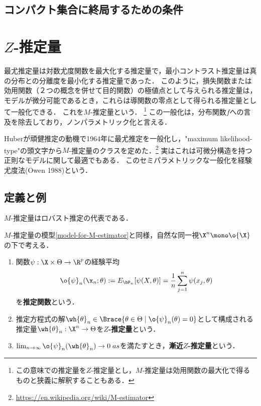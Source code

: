 \documentclass[uplatex,dvipdfmx]{jsreport}
\begin{document}
\subsection{コンパクト集合に終局するための条件}

\section{$Z$-推定量}

\begin{tcolorbox}[colframe=ForestGreen, colback=ForestGreen!10!white,breakable,colbacktitle=ForestGreen!40!white,coltitle=black,fonttitle=\bfseries\sffamily,
title=最尤法のノンパラメトリック化]
    最尤推定量は対数尤度関数を最大化する推定量で，最小コントラスト推定量は真の分布との分離度を最小化する推定量であった．
    このように，損失関数または効用関数（２つの概念を併せて目的関数）の極値点として与えられる推定量は，
    モデルが微分可能であるとき，これらは導関数の零点として得られる推定量として一般化できる．
    これを$M$-推定量という．
    \footnote{この意味での推定量を$Z$-推定量とし，$M$-推定量は効用関数の最大化で得るものと狭義に解釈することもある．}
    この一般化は，分布関数$f$への言及を除去しており，ノンパラメトリック化と言える．

    Huberが頑健推定の動機で1964年に最尤推定を一般化し，"maximum likelihood-type"の頭文字から$M$-推定量のクラスを定めた．\footnote{\url{https://en.wikipedia.org/wiki/M-estimator}}
    実はこれは可微分構造を持つ正則なモデルに関して最適でもある．
    このセミパラメトリックな一般化を経験尤度法(Owen 1988)という．
\end{tcolorbox}

\subsection{定義と例}

\begin{tcolorbox}[colframe=ForestGreen, colback=ForestGreen!10!white,breakable,colbacktitle=ForestGreen!40!white,coltitle=black,fonttitle=\bfseries\sffamily,
title=]
    $M$-推定量はロバスト推定の代表である．
\end{tcolorbox}

\begin{model}[$Z$-推定量が構成可能なモデル]\label{model-for-Z-estimator}
    $M$-推定量の模型\ref{model-for-M-estimator}と同様，自然な同一視$\X^n\mono\o{\X}$の下で考える．
    \begin{enumerate}
        \item 関数$\psi:\X\times\Theta\to\R^p$の経験平均
        \[\o{\psi}_n(\x_n;\theta):=E_{\bP_n}[\psi(X,\theta)]=\frac{1}{n}\sum_{j=1}^n\psi(x_j,\theta)\]
        を\textbf{推定関数}という．
        \item 推定方程式の解$\wh{\theta}_n\in\Brace{\theta\in\Theta\mid\o{\psi}_n(\theta)=0}$として構成される推定量$\wh{\theta}_n:\X^n\to\Theta$を\textbf{$Z$-推定量}という．
        \item $\lim_{n\to\infty}\o{\psi}_n(\wh{\theta}_n)\to0\;as$を満たすとき，\textbf{漸近$Z$-推定量}という．
    \end{enumerate}
\end{model}
\end{document}
